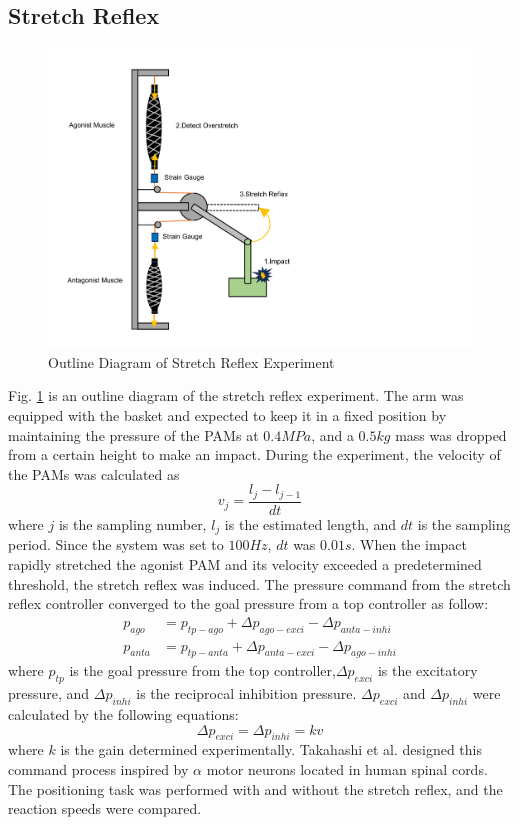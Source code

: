 \subsection{Stretch Reflex}
\begin{figure}[h]
    \centering
    \includegraphics[width=0.7\columnwidth]{fig/reflex_experiment.pdf}
    \caption{Outline Diagram of Stretch Reflex Experiment}
    \label{fig:reflex_equipment}
 \end{figure}
Fig. \ref{fig:reflex_equipment} is an outline diagram of the stretch reflex experiment.
The arm was equipped with the basket and expected to keep it in a fixed position by maintaining the pressure of the PAMs at $0.4\si{MPa}$, and a $0.5\si{kg}$ mass was dropped from a certain height to make an impact. During the experiment, the velocity of the PAMs was calculated as 
\begin{equation}
    \label{eq:velocity}
    v_j = \frac{l_j -l_{j-1}}{dt}
\end{equation}
where $j$ is the sampling number, $l_j$ is the estimated length, and $dt$ is the sampling period.
Since the system was set to $100 \si{Hz}$, $dt$ was $0.01 \si{s}$.
When the impact rapidly stretched the agonist PAM and its velocity exceeded a predetermined threshold, the stretch reflex was induced. The pressure command from the stretch reflex controller converged to the goal pressure from a top controller as follow:
\begin{align}
    \label{eq:command_pressure}
    p_{ago} &= p_{tp - ago} + \Delta p_{ago - exci} - \Delta p_{anta - inhi} \\
    p_{anta} &= p_{tp - anta} + \Delta p_{anta - exci} - \Delta p_{ago - inhi}
\end{align}
where $p_{tp}$ is the goal pressure from the top controller,$\Delta p_{exci}$ is the excitatory pressure, and $ \Delta p_{inhi}$ is the reciprocal inhibition pressure. 
$\Delta p_{exci}$ and $\Delta p_{inhi}$ were calculated by the following equations:
\begin{equation}
    \label{eq:reflex_pressure}
    \Delta p_{exci} =  \Delta p_{inhi} = kv
\end{equation}
where $k$ is the gain determined experimentally.
Takahashi et al. designed this command process inspired by $\alpha$ motor neurons located in human spinal cords\cite{takahashi}. The positioning task was performed with and without the stretch reflex, and the reaction speeds were compared.


